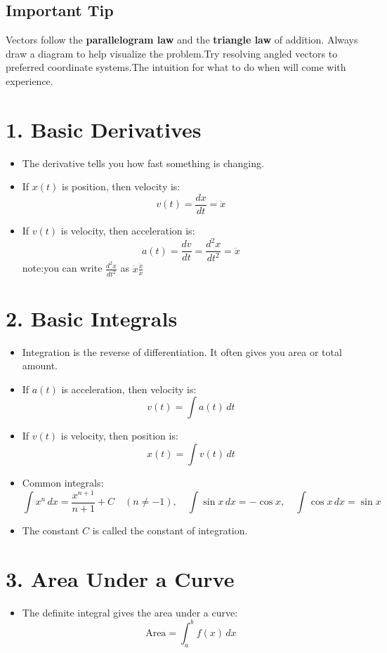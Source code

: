 \documentclass[12pt]{article}
\begin{document}
\subsection*{Important Tip}
Vectors follow the \textbf{parallelogram law} and the \textbf{triangle law} of addition. Always draw a diagram to help visualize the problem.Try resolving angled vectors to preferred coordinate systems.The intuition for what to do when will come with experience.


\section*{1. Basic Derivatives}
\begin{itemize}
    \item The derivative tells you how fast something is changing.
    \item If \( x(t) \) is position, then velocity is: 
    \[
    v(t) = \frac{dx}{dt}=\dot{x}
    \]
    \item If \( v(t) \) is velocity, then acceleration is: 
    \[
    a(t) = \frac{dv}{dt} = \frac{d^2x}{dt^2}=\ddot{x}
    \]
    note:you can write $ \frac{d^2x}{dt^2}$ as $\dot{x}\frac{\dot{x}}{x}$
    
\end{itemize}

\section*{2. Basic Integrals}
\begin{itemize}
    \item Integration is the reverse of differentiation. It often gives you area or total amount.
    \item If \( a(t) \) is acceleration, then velocity is:
    \[
    v(t) = \int a(t) \, dt
    \]
    \item If \( v(t) \) is velocity, then position is:
    \[
    x(t) = \int v(t) \, dt
    \]
    \item Common integrals:
    \[
    \int x^n \, dx = \frac{x^{n+1}}{n+1} + C \quad (n \neq -1), \quad \int \sin x \, dx = -\cos x, \quad \int \cos x \, dx = \sin x
    \]
    \item The constant \( C \) is called the constant of integration.
\end{itemize}

\section*{3. Area Under a Curve}
\begin{itemize}
    \item The definite integral gives the area under a curve:
    \[
    \text{Area} = \int_{a}^{b} f(x) \, dx
    \]
\end{itemize}
\end{document}
